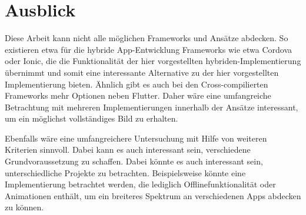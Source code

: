 

\section{Ausblick}
Diese Arbeit kann nicht alle möglichen Frameworks und Ansätze abdecken. So existieren etwa für die hybride App-Entwicklung Frameworks wie etwa Cordova oder Ionic, die die Funktionalität der hier vorgestellten hybriden-Implementierung übernimmt und somit eine interessante Alternative zu der hier vorgestellten Implementierung bieten. Ähnlich gibt es auch bei den Cross-compilierten Frameworks mehr Optionen neben Flutter. Daher wäre eine umfangreiche Betrachtung mit mehreren Implementierungen innerhalb der Ansätze interessant, um ein möglichst vollständiges Bild zu erhalten.

Ebenfalls wäre eine umfangreichere Untersuchung mit Hilfe von weiteren Kriterien sinnvoll. Dabei kann es auch interessant sein, verschiedene Grundvoraussetzung zu schaffen. Dabei könnte es auch interessant sein, unterschiedliche Projekte zu betrachten. Beispielsweise könnte eine Implementierung betrachtet werden, die lediglich Offlinefunktionalität oder Animationen enthält, um ein breiteres Spektrum an verschiedenen Apps abdecken zu können.

